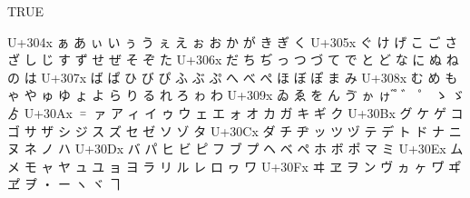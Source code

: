 \documentclass{ltjarticle}\usepackage{luatexja-adjust}
\begin{document}
\par
\newpage\ltjenableadjust[combinevoicedkana] TRUE
{\obeylines\ttfamily
U+304x          ぁ      あ      ぃ      い      ぅ      う      ぇ      え      ぉ      お      か      が      き      ぎ      く
U+305x  ぐ      け      げ      こ      ご      さ      ざ      し      じ      す      ず      せ      ぜ      そ      ぞ      た
U+306x  だ      ち      ぢ      っ      つ      づ      て      で      と      ど      な      に      ぬ      ね      の      は
U+307x  ば      ぱ      ひ      び      ぴ      ふ      ぶ      ぷ      へ      べ      ぺ      ほ      ぼ      ぽ      ま      み
U+308x  む      め      も      ゃ      や      ゅ      ゆ      ょ      よ      ら      り      る      れ      ろ      ゎ      わ
U+309x  ゐ      ゑ      を      ん      ゔ      ゕ      ゖ                      ゙        ゚        ゛      ゜      ゝ      ゞ      ゟ 
U+30Ax  ゠      ァ      ア      ィ      イ      ゥ      ウ      ェ      エ      ォ      オ      カ      ガ      キ      ギ      ク
U+30Bx  グ      ケ      ゲ      コ      ゴ      サ      ザ      シ      ジ      ス      ズ      セ      ゼ      ソ      ゾ      タ
U+30Cx  ダ      チ      ヂ      ッ      ツ      ヅ      テ      デ      ト      ド      ナ      ニ      ヌ      ネ      ノ      ハ
U+30Dx  バ      パ      ヒ      ビ      ピ      フ      ブ      プ      ヘ      ベ      ペ      ホ      ボ      ポ      マ      ミ
U+30Ex  ム      メ      モ      ャ      ヤ      ュ      ユ      ョ      ヨ      ラ      リ      ル      レ      ロ      ヮ      ワ
U+30Fx  ヰ      ヱ      ヲ      ン      ヴ      ヵ      ヶ      ワ゚      ヰ゚      ヱ゚      ヲ゚      ・      ー      ヽ      ヾ      ヿ 
\par}
\end{document}
